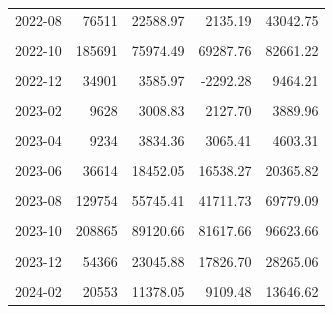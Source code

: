 \begin{longtable}[t]{crrrr}
2022-08 & 76511 & 22588.97 & 2135.19 & 43042.75\\
\cellcolor{gray!10}{2022-09} & \cellcolor{gray!10}{294680} & \cellcolor{gray!10}{151389.22} & \cellcolor{gray!10}{133540.32} & \cellcolor{gray!10}{169238.12}\\
2022-10 & 185691 & 75974.49 & 69287.76 & 82661.22\\
\cellcolor{gray!10}{2022-11} & \cellcolor{gray!10}{91955} & \cellcolor{gray!10}{34521.93} & \cellcolor{gray!10}{28737.57} & \cellcolor{gray!10}{40306.29}\\
2022-12 & 34901 & 3585.97 & -2292.28 & 9464.21\\
\cellcolor{gray!10}{2023-01} & \cellcolor{gray!10}{13055} & \cellcolor{gray!10}{2880.29} & \cellcolor{gray!10}{666.94} & \cellcolor{gray!10}{5093.65}\\
2023-02 & 9628 & 3008.83 & 2127.70 & 3889.96\\
\cellcolor{gray!10}{2023-03} & \cellcolor{gray!10}{10351} & \cellcolor{gray!10}{4886.80} & \cellcolor{gray!10}{3134.05} & \cellcolor{gray!10}{6639.54}\\
2023-04 & 9234 & 3834.36 & 3065.41 & 4603.31\\
\cellcolor{gray!10}{2023-05} & \cellcolor{gray!10}{20327} & \cellcolor{gray!10}{9599.80} & \cellcolor{gray!10}{8571.72} & \cellcolor{gray!10}{10627.88}\\
2023-06 & 36614 & 18452.05 & 16538.27 & 20365.82\\
\cellcolor{gray!10}{2023-07} & \cellcolor{gray!10}{57487} & \cellcolor{gray!10}{22105.88} & \cellcolor{gray!10}{21094.76} & \cellcolor{gray!10}{23117.01}\\
2023-08 & 129754 & 55745.41 & 41711.73 & 69779.09\\
\cellcolor{gray!10}{2023-09} & \cellcolor{gray!10}{228974} & \cellcolor{gray!10}{99786.79} & \cellcolor{gray!10}{79984.30} & \cellcolor{gray!10}{119589.28}\\
2023-10 & 208865 & 89120.66 & 81617.66 & 96623.66\\
\cellcolor{gray!10}{2023-11} & \cellcolor{gray!10}{145959} & \cellcolor{gray!10}{72014.66} & \cellcolor{gray!10}{58186.73} & \cellcolor{gray!10}{85842.58}\\
2023-12 & 54366 & 23045.88 & 17826.70 & 28265.06\\
\cellcolor{gray!10}{2024-01} & \cellcolor{gray!10}{22910} & \cellcolor{gray!10}{8822.07} & \cellcolor{gray!10}{6375.10} & \cellcolor{gray!10}{11269.04}\\
2024-02 & 20553 & 11378.05 & 9109.48 & 13646.62\\

\end{longtable}
